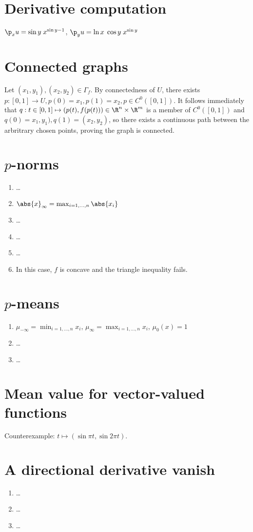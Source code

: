 \documentclass{article}
\begin{document}

\section{Derivative computation}
$\p_x u = \sin y \; x^{\sin y - 1}$, $\p_y u = \ln x \; \cos y \; x^{\sin y}$

\section{Connected graphs}
Let $(x_1, y_1), (x_2, y_2) \in \Gamma_f$. 
By connectedness of $U$, there exists $p: [0, 1] \to U, p(0) = x_1, p(1) = x_2, p \in C^0([0, 1])$. 
It follows immediately that $q: t \in [0, 1] \mapsto (p(t), f(p(t))) \in \R^n \times \R^m$ is a member of $C^0([0, 1])$ and $q(0) = x_1, y_1), q(1) = (x_2, y_2)$, so there exists a continuous path between the arbritrary chosen points, proving the graph is connected. 

\section{$p$-norms}
\begin{enumerate}
    \item \dots 
    
    \item $\abs{x}_\infty = \max_{i=1,\ldots,n} \abs{x_i}$
    
    \item \dots 
    
    \item \dots 
    
    \item \dots
    
    \item In this case, $f$ is concave and the triangle inequality fails. 
\end{enumerate}

\section{$p$-means}
\begin{enumerate}
    \item $\mu_{-\infty} = \min_{i=1,\ldots,n} x_i$, $\mu_\infty = \max_{i=1,\ldots,n} x_i$, $\mu_0(x) = 1$
    
    \item \dots 
    
    \item \dots
\end{enumerate}

\section{Mean value for vector-valued functions}
Counterexample: $t \mapsto (\sin \pi t, \sin 2\pi t)$. 

\section{A directional derivative vanish}
\begin{enumerate}
    \item \dots 
    
    \item \dots 
    
    \item \dots
\end{enumerate}
\end{document}

